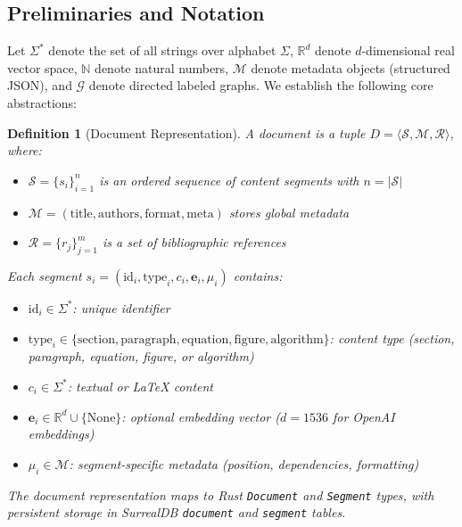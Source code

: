 \documentclass{ieeeaccess}
\newtheorem{definition}{Definition}
\begin{document}
\subsection{Preliminaries and Notation}

Let \(\Sigma^*\) denote the set of all strings over alphabet \(\Sigma\), \(\mathbb{R}^{d}\) denote \(d\)-dimensional real vector space, \(\mathbb{N}\) denote natural numbers, \(\mathcal{M}\) denote metadata objects (structured JSON), and \(\mathcal{G}\) denote directed labeled graphs. We establish the following core abstractions:

\begin{definition}[Document Representation]
A document is a tuple \(D = \langle \mathcal{S}, \mathcal{M}, \mathcal{R} \rangle\), where:
\begin{itemize}
\item \(\mathcal{S} = \{s_i\}_{i=1}^{n}\) is an ordered sequence of content segments with \(n = |\mathcal{S}|\)
\item \(\mathcal{M} = (\text{title}, \text{authors}, \text{format}, \text{meta})\) stores global metadata
\item \(\mathcal{R} = \{r_j\}_{j=1}^{m}\) is a set of bibliographic references
\end{itemize}

Each segment \(s_i = (\text{id}_i, \text{type}_i, c_i, \mathbf{e}_i, \mu_i)\) contains:
\begin{itemize}
\item \(\text{id}_i \in \Sigma^*\): unique identifier
\item \(\text{type}_i \in \{\text{section}, \text{paragraph}, \text{equation}, \text{figure}, \text{algorithm}\}\): content type (section, paragraph, equation, figure, or algorithm)
\item \(c_i \in \Sigma^*\): textual or LaTeX content
\item \(\mathbf{e}_i \in \mathbb{R}^{d} \cup \{\text{None}\}\): optional embedding vector (\(d=1536\) for OpenAI embeddings)
\item \(\mu_i \in \mathcal{M}\): segment-specific metadata (position, dependencies, formatting)
\end{itemize}

The document representation maps to Rust \texttt{Document} and \texttt{Segment} types, with persistent storage in SurrealDB \texttt{document} and \texttt{segment} tables.
\end{definition}
\end{document}
